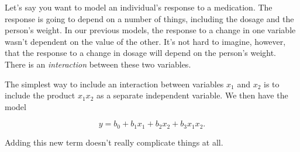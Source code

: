 \documentclass[
]{book}
\theoremstyle{definition}
\theoremstyle{definition}
\theoremstyle{definition}
\theoremstyle{definition}
\theoremstyle{remark}
\begin{document}
Let's say you want to model an individual's response to a medication. The response is going to depend on a number of things, including the dosage and the person's weight. In our previous models, the response to a change in one variable wasn't dependent on the value of the other. It's not hard to imagine, however, that the response to a change in dosage will depend on the person's weight. There is an \emph{interaction} between these two variables.

The simplest way to include an interaction between variables \(x_1\) and \(x_2\) is to include the product \(x_1 x_2\) as a separate independent variable. We then have the model

\[y=b_0+b_1 x_1+b_2 x_2+b_3 x_1 x_2.\]

Adding this new term doesn't really complicate things at all.
\end{document}
